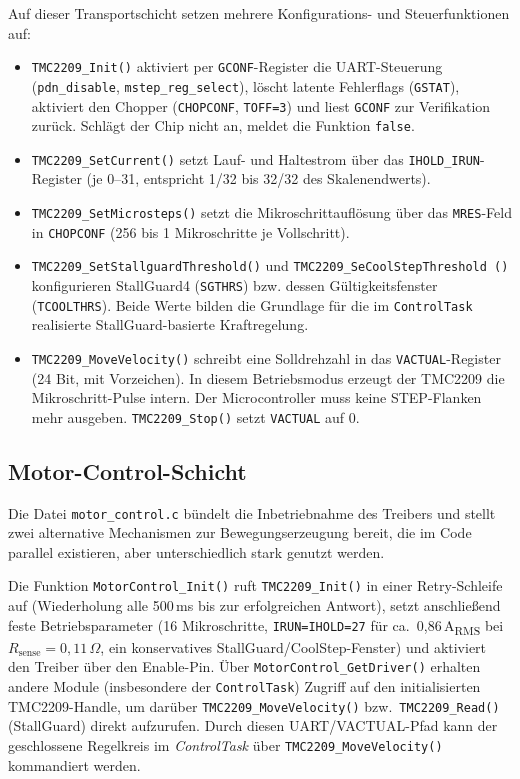 Auf dieser Transportschicht setzen mehrere Konfigurations- und Steuerfunktionen auf:
\begin{itemize}
    \item \texttt{TMC2209\_Init()} aktiviert per \texttt{GCONF}-Register die UART-Steuerung (\texttt{pdn\_disable}, \texttt{mstep\_reg\_select}), löscht latente Fehlerflags (\texttt{GSTAT}), aktiviert den Chopper (\texttt{CHOPCONF}, \texttt{TOFF=3}) und liest \texttt{GCONF} zur Verifikation zurück. Schlägt der Chip nicht an, meldet die Funktion \texttt{false}.
    \item \texttt{TMC2209\_SetCurrent()} setzt Lauf- und Haltestrom über das \texttt{IHOLD\_IRUN}-Register (je 0–31, entspricht 1/32 bis 32/32 des Skalenendwerts).
    \item \texttt{TMC2209\_SetMicrosteps()} setzt die Mikroschrittauflösung über das \texttt{MRES}-Feld in \texttt{CHOPCONF} (256 bis 1 Mikroschritte je Vollschritt).
    \item \texttt{TMC2209\_SetStallguardThreshold()} und \texttt{TMC2209\_SeCoolStepThreshold ()} konfigurieren StallGuard4 (\texttt{SGTHRS}) bzw. dessen Gültigkeitsfenster (\texttt{TCOOLTHRS}). Beide Werte bilden die Grundlage für die im \texttt{ControlTask} realisierte StallGuard-basierte Kraftregelung.
    \item \texttt{TMC2209\_MoveVelocity()} schreibt eine Solldrehzahl in das \texttt{VACTUAL}-Register (24 Bit, mit Vorzeichen). In diesem Betriebsmodus erzeugt der TMC2209 die Mikroschritt-Pulse intern. Der Microcontroller muss keine STEP-Flanken mehr ausgeben. \texttt{TMC2209\_Stop()} setzt \texttt{VACTUAL} auf 0.
\end{itemize}

\subsection{Motor-Control-Schicht}

Die Datei \texttt{motor\_control.c} bündelt die Inbetriebnahme des Treibers und stellt zwei alternative Mechanismen zur Bewegungserzeugung bereit, die im Code parallel existieren, aber unterschiedlich stark genutzt werden.

Die Funktion \texttt{MotorControl\_Init()} ruft \texttt{TMC2209\_Init()} in einer Retry-Schleife auf (Wiederholung alle 500\,ms bis zur erfolgreichen Antwort), setzt anschließend feste Betriebsparameter (16 Mikroschritte, \texttt{IRUN=IHOLD=27} für ca.\ 0{,}86\,A\textsubscript{RMS} bei $R_\text{sense}=0{,}11\,\Omega$, ein konservatives StallGuard/CoolStep-Fenster) und aktiviert den Treiber über den Enable-Pin. Über \texttt{MotorControl\_GetDriver()} erhalten andere Module (insbesondere der \texttt{ControlTask}) Zugriff auf den initialisierten TMC2209-Handle, um darüber \texttt{TMC2209\_MoveVelocity()} bzw.\ \texttt{TMC2209\_Read()} (StallGuard) direkt aufzurufen. Durch diesen UART/VACTUAL-Pfad kann der geschlossene Regelkreis im \textit{ControlTask} über \texttt{TMC2209\_MoveVelocity()} kommandiert werden.


